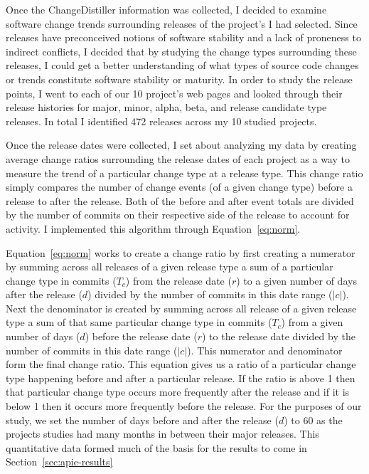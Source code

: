 Once the ChangeDistiller information was collected, I decided to examine software change trends surrounding releases of the project's I had selected. Since releases
have preconceived notions of software stability and a lack of proneness to indirect conflicts, 
I decided that by studying the change types surrounding these releases, I could get a better understanding of
what types of source code changes or trends constitute software stability or maturity. In order to study the release points, I went to each of our 10 project's 
web pages and looked through their release histories for major, minor, alpha, beta, and release candidate type releases. In total I identified 472 releases
across my 10 studied projects.  

Once the release dates were collected, I set about analyzing my data by creating average change ratios surrounding the release dates of each 
project as a way to measure the trend of a particular change type at a release type. This change ratio simply compares the number of change events (of a given
change type) before a release to after the release. Both of the before and after event totals are divided by the number of commits on their respective side
of the release to account for activity. I implemented this algorithm through Equation~\ref{eq:norm}.

Equation~\ref{eq:norm} works to create a change ratio by first creating a numerator by summing across all releases of
a given release type a sum of a particular change type in commits ($T_c$)
from the release date ($r$) to a given number of days after the release ($d$) divided by the number of commits in this date range ($|c|$). Next the denominator
is created by summing across all release of a given release type
a sum of that same particular change type in commits ($T_c$) from a given number of days ($d$) before the release date ($r$) to
the release date divided by the number of commits in this date range ($|c|$). This numerator and denominator form the final change ratio.
This equation gives us a ratio of a particular change type happening before and after a particular release. If the ratio is above 1 then that particular change
type occurs more frequently after the release and if it is below 1 then it occurs more frequently before the release. For the purposes of our study, we set the
number of days before and after the release ($d$) to 60 as the projects studies had many months in between their major releases. This quantitative data
formed much of the basis for the results to come in Section~\ref{sec:apie-results}

